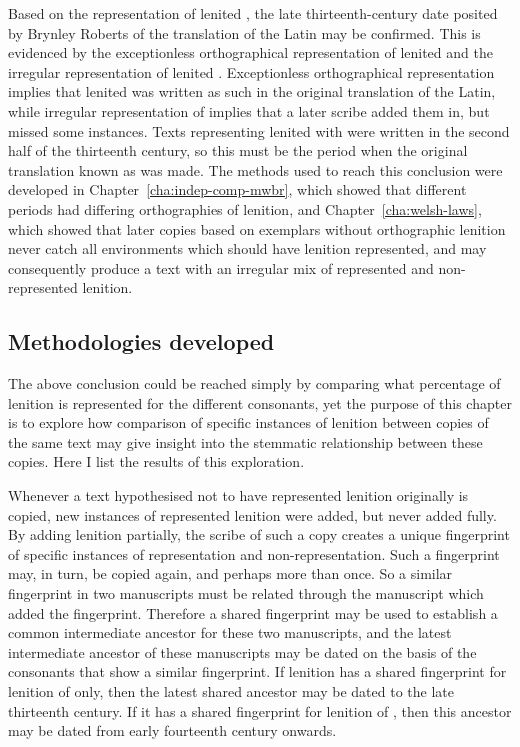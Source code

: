 Based on the representation of lenited , the late thirteenth-century date  posited by Brynley Roberts of the translation of the Latin  may be confirmed. This is evidenced by the exceptionless orthographical representation of lenited  and the irregular representation of lenited . Exceptionless orthographical representation implies that lenited  was written as such in the original translation of the Latin, while irregular representation of  implies that a later scribe added them in, but missed some instances. Texts representing lenited  with  were written in the second half of the thirteenth century, so this must be the period when the original translation known as  was made. The methods used to reach this conclusion were developed in Chapter~\ref{cha:indep-comp-mwbr}, which showed that different periods had differing orthographies of lenition, and Chapter~\ref{cha:welsh-laws}, which showed that later copies based on exemplars without orthographic lenition never  catch all environments which should have lenition represented, and may consequently produce a text with an irregular mix of represented and non-represented lenition.

\subsection{Methodologies developed}
\label{sec:meth-devel}

The above conclusion could be reached simply by comparing what percentage of lenition is represented for the different consonants, yet the purpose of this chapter is to explore how comparison of specific instances of lenition between copies of the same text may give insight into the stemmatic relationship between these copies. Here I list the results of this exploration.

Whenever a text hypothesised not to have represented lenition originally is copied, new instances of represented lenition were added, but never added fully. By adding lenition partially, the scribe of such a copy creates a unique fingerprint of specific instances of representation and non-representation. Such a fingerprint may, in turn, be copied again, and perhaps more than once. So a similar fingerprint in two manuscripts must be related through the manuscript which added the fingerprint. Therefore a shared fingerprint may be used to establish a common intermediate ancestor for these two manuscripts, and the latest intermediate ancestor of these manuscripts may be dated on the basis of the consonants that show a similar fingerprint. If lenition has a shared fingerprint for lenition of  only, then the latest shared ancestor may be dated to the late thirteenth century. If it has a shared fingerprint for lenition of , then this ancestor may be dated from early fourteenth century onwards.

